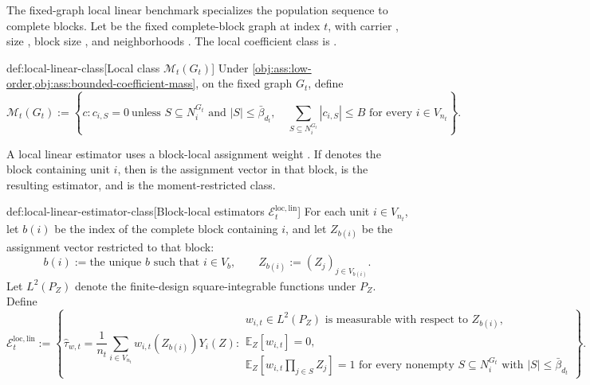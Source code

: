 The fixed-graph local linear benchmark specializes the population sequence to complete blocks. Let  be the fixed complete-block graph at index \(t\), with carrier , size , block size , and neighborhoods . The local coefficient class is .

\begin{definitionv}{def:local-linear-class}[Local class \(\mathcal M_t(G_t)\)]
Under \cref{obj:ass:low-order,obj:ass:bounded-coefficient-mass}, on the fixed graph \(G_t\), define
\[
\mathcal M_t(G_t)
:=
\left\{
c:
c_{i,S}=0\ \text{unless } S\subseteq N_i^{G_t}\text{ and } |S|\le \bar\beta_{d_t},
\quad
\sum_{S\subseteq N_i^{G_t}} |c_{i,S}|\le B
\text{ for every } i\in V_{n_t}
\right\}.
\]
\end{definitionv}

A local linear estimator uses a block-local assignment weight . If  denotes the block containing unit \(i\), then  is the assignment vector in that block,  is the resulting estimator, and  is the moment-restricted class.

\begin{definitionv}{def:local-linear-estimator-class}[Block-local estimators $\mathcal E_t^{\mathrm{loc,lin}}$]
For each unit \(i\in V_{n_t}\), let \(b(i)\) be the index of the complete block containing \(i\), and let \(Z_{b(i)}\) be the assignment vector restricted to that block:
\[
b(i)
:=
\text{the unique } b \text{ such that } i\in V_b,
\qquad
Z_{b(i)}
:=
(Z_j)_{j\in V_{b(i)}}.
\]
Let \(L^2(P_Z)\) denote the finite-design square-integrable functions under \(P_Z\). Define
\[
\mathcal E_t^{\mathrm{loc,lin}}
:=
\left\{
\widehat\tau_{w,t}
=
\frac{1}{n_t}\sum_{i\in V_{n_t}} w_{i,t}(Z_{b(i)})Y_i(Z):
\begin{array}{l}
w_{i,t}\in L^2(P_Z)\text{ is measurable with respect to }Z_{b(i)},\\
\mathbb E_Z[w_{i,t}]=0,\\
\mathbb E_Z\left[w_{i,t}\prod_{j\in S}Z_j\right]=1
\text{ for every nonempty }S\subseteq N_i^{G_t}
\text{ with }|S|\le\bar\beta_{d_t}
\end{array}
\right\}.
\]
\end{definitionv}

